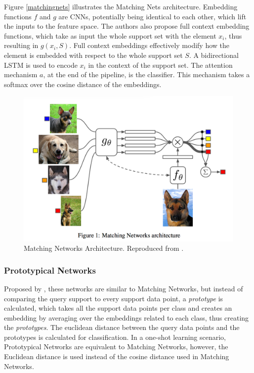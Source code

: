 Figure \ref{matchingnets} illustrates the Matching Nets architecture. Embedding functions $f$ and $g$ are CNNs, potentially being identical to each other, which lift the inputs to the feature space. The authors also propose full context embedding functions, which take as input the whole support set with the element $x_i$, thus resulting in \( g(x_i, S) \). Full context embeddings effectively modify how the element is embedded with respect to the whole support set $S$. A bidirectional LSTM is used to encode $x_i$ in the context of the support set. The attention mechanism $a$, at the end of the pipeline, is the classifier. This mechanism takes a softmax over the cosine distance of the embeddings. 

\begin{figure}[h]
\centering
\includegraphics[width=0.7\linewidth]{img/matching networks.png}
\caption[Matching Networks Architecture]{Matching Networks Architecture. Reproduced from \citet{vinyals2016matching}.}
\label{fig:matchingnets}
\end{figure}

\subsubsection{Prototypical Networks}

Proposed by \citet{snell2017prototypical}, these networks are similar to Matching Networks, but instead of comparing the query support to every support data point, a \textit{prototype} is calculated, which takes all the support data points per class and creates an embedding by averaging over the embeddings related to each class, thus creating the \textit{prototypes}. The euclidean distance between the query data points and the prototypes is calculated for classification. In a one-shot learning scenario, Prototypical Networks are equivalent to Matching Networks, however, the Euclidean distance is used instead of the cosine distance used in Matching Networks.

